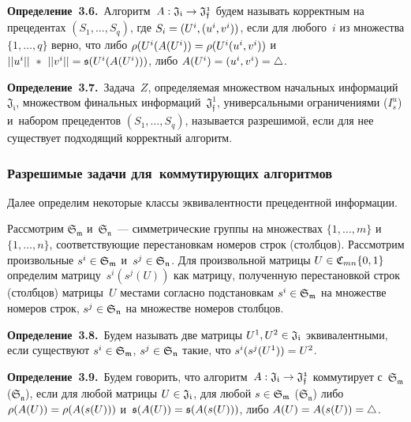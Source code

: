 \begin{multicols}{2}
\smallskip

\noindent
\textbf{Определение~3.6.}\ Алгоритм~$A: 
\mathfrak{J_i} \hm\rightarrow \mathfrak{J_f^1}$ будем называть корректным на 
прецедентах $(S_1,\ldots,S_q)$, где $S_i \hm= (U^i , (u^i, v^i))$, если для любого~$i$ 
из множества $\{1,\ldots,q\}$ верно, что либо $\rho(U^i(A(U^i)) \hm= 
\rho(U^i(u^i, v^i))$ и~$||u^i||~*~||v^i||\hm = \mathfrak{s}(U^i(A(U^i)))$, 
либо $A(U^i)\hm=(u^i,  v^i)\hm=\triangle$.

\smallskip

\noindent
\textbf{Определение~3.7.}\
Задача~$Z$, определяемая множеством начальных информаций~$\mathfrak{J_i}$, 
множеством финальных информаций~$\mathfrak{J_{f}^1}$, универсальными 
ограничениями ($I_s^u$) и~набором прецедентов  $(S_1,\ldots,S_q)$, называется 
разрешимой, если для нее существует подходящий корректный алгоритм.

\subsubsection{Разрешимые  задачи для~коммутирующих алгоритмов}

Далее определим некоторые классы эквивалентности прецедентной информации.

Рассмотрим $\mathfrak{S_m}$ и~$\mathfrak{S_n}$~--- симметрические группы на 
множествах $\{1,\ldots,m\}$ и~$\{1,\ldots,n\}$, со\-от\-вет\-ст\-ву\-ющие перестановкам номеров 
строк (столбцов). Рассмотрим произвольные $s^i\hm\in \mathfrak{S_m}$  
и~$s^j\hm\in \mathfrak{S_n}$. Для произвольной матрицы $U \hm\in 
\mathfrak{C}_{mn}\{0,1\}$ определим матрицу~$s^i(s^j(U))$ как матрицу, 
полученную перестановкой строк (столбцов) матрицы~$U$ местами согласно 
подстановкам $s^i \hm\in \mathfrak{S_m}$ на множестве номеров строк,  $s^j \hm\in 
\mathfrak{S_n}$ на множестве номеров столбцов.

\smallskip

\noindent
\textbf{Определение~3.8.}\
Будем называть две матрицы $U^1, U^2 \hm\in \mathfrak{J_i}$ эквивалентными, если 
существуют $ s^i \hm\in \mathfrak{S_m}$,  $s^j \hm\in \mathfrak{S_n}$ такие, что 
$s^i(s^j(U^1)) \hm= U^2$.

\smallskip

\noindent
\textbf{Определение~3.9.}\
Будем говорить, что алгоритм~$A: \mathfrak{J_i} \hm\rightarrow \mathfrak{J_f^1}$ 
коммутирует с~$\mathfrak{S_m}$ ($\mathfrak{S_n}$), если для любой матрицы $U \hm\in 
\mathfrak{J_i}$, для любой $s \hm\in \mathfrak{S_m}$ ($\mathfrak{S_n}$) либо 
$\rho(A(U))\hm=\rho(A(s(U)))$ и~$\mathfrak{s}(A(U)) \hm= \mathfrak{s}(A(s(U)))$, 
либо $A(U)\hm=A(s(U))\hm=\triangle$.


\end{multicols}

